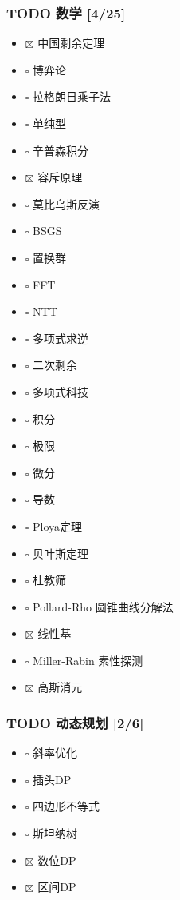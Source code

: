 \documentclass[11pt]{article}
\begin{document}
\subsubsection{{\bfseries\sffamily TODO} 数学 [4/25]}
\label{sec:org09b98e8}

\begin{itemize}
\item $\boxtimes$ 中国剩余定理
\item $\square$ 博弈论
\item $\square$ 拉格朗日乘子法
\item $\square$ 单纯型
\item $\square$ 辛普森积分
\item $\boxtimes$ 容斥原理
\item $\square$ 莫比乌斯反演
\item $\square$ BSGS
\item $\square$ 置换群
\item $\square$ FFT
\item $\square$ NTT
\item $\square$ 多项式求逆
\item $\square$ 二次剩余
\item $\square$ 多项式科技
\item $\square$ 积分
\item $\square$ 极限
\item $\square$ 微分
\item $\square$ 导数
\item $\square$ Ploya定理
\item $\square$ 贝叶斯定理
\item $\square$ 杜教筛
\item $\square$ Pollard-Rho 圆锥曲线分解法
\item $\boxtimes$ 线性基
\item $\square$ Miller-Rabin 素性探测
\item $\boxtimes$ 高斯消元
\end{itemize}

\subsubsection{{\bfseries\sffamily TODO} 动态规划 [2/6]}
\label{sec:orga7cf2df}

\begin{itemize}
\item $\square$ 斜率优化
\item $\square$ 插头DP
\item $\square$ 四边形不等式
\item $\square$ 斯坦纳树
\item $\boxtimes$ 数位DP
\item $\boxtimes$ 区间DP
\end{itemize}
\end{document}
